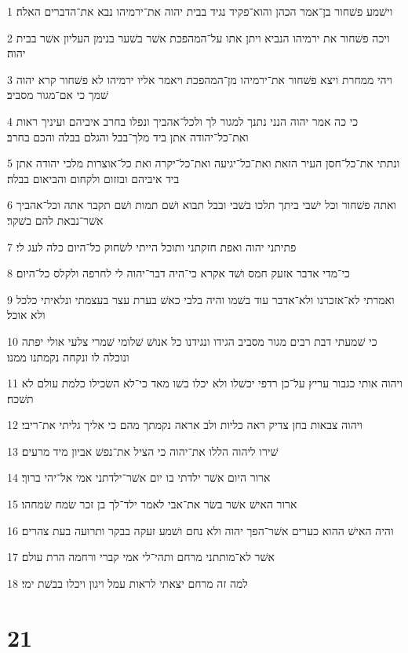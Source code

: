 \par 1 וישׁמע פשׁחור בן־אמר הכהן והוא־פקיד נגיד בבית יהוה את־ירמיהו נבא את־הדברים האלה׃
\par 2 ויכה פשׁחור את ירמיהו הנביא ויתן אתו על־המהפכת אשׁר בשׁער בנימן העליון אשׁר בבית יהוה׃
\par 3 ויהי ממחרת ויצא פשׁחור את־ירמיהו מן־המהפכת ויאמר אליו ירמיהו לא פשׁחור קרא יהוה שׁמך כי אם־מגור מסביב׃
\par 4 כי כה אמר יהוה הנני נתנך למגור לך ולכל־אהביך ונפלו בחרב איביהם ועיניך ראות ואת־כל־יהודה אתן ביד מלך־בבל והגלם בבלה והכם בחרב׃
\par 5 ונתתי את־כל־חסן העיר הזאת ואת־כל־יגיעה ואת־כל־יקרה ואת כל־אוצרות מלכי יהודה אתן ביד איביהם ובזזום ולקחום והביאום בבלה׃
\par 6 ואתה פשׁחור וכל ישׁבי ביתך תלכו בשׁבי ובבל תבוא ושׁם תמות ושׁם תקבר אתה וכל־אהביך אשׁר־נבאת להם בשׁקר׃
\par 7 פתיתני יהוה ואפת חזקתני ותוכל הייתי לשׂחוק כל־היום כלה לעג לי׃
\par 8 כי־מדי אדבר אזעק חמס ושׁד אקרא כי־היה דבר־יהוה לי לחרפה ולקלס כל־היום׃
\par 9 ואמרתי לא־אזכרנו ולא־אדבר עוד בשׁמו והיה בלבי כאשׁ בערת עצר בעצמתי ונלאיתי כלכל ולא אוכל׃
\par 10 כי שׁמעתי דבת רבים מגור מסביב הגידו ונגידנו כל אנושׁ שׁלומי שׁמרי צלעי אולי יפתה ונוכלה לו ונקחה נקמתנו ממנו׃
\par 11 ויהוה אותי כגבור עריץ על־כן רדפי יכשׁלו ולא יכלו בשׁו מאד כי־לא השׂכילו כלמת עולם לא תשׁכח׃
\par 12 ויהוה צבאות בחן צדיק ראה כליות ולב אראה נקמתך מהם כי אליך גליתי את־ריבי׃
\par 13 שׁירו ליהוה הללו את־יהוה כי הציל את־נפשׁ אביון מיד מרעים׃
\par 14 ארור היום אשׁר ילדתי בו יום אשׁר־ילדתני אמי אל־יהי ברוך׃
\par 15 ארור האישׁ אשׁר בשׂר את־אבי לאמר ילד־לך בן זכר שׂמח שׂמחהו׃
\par 16 והיה האישׁ ההוא כערים אשׁר־הפך יהוה ולא נחם ושׁמע זעקה בבקר ותרועה בעת צהרים׃
\par 17 אשׁר לא־מותתני מרחם ותהי־לי אמי קברי ורחמה הרת עולם׃
\par 18 למה זה מרחם יצאתי לראות עמל ויגון ויכלו בבשׁת ימי׃

\chapter{21}

